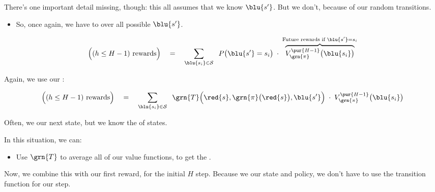         \subsecdiv

        There's one important detail missing, though: this all assumes that we know $\blu{s'}$. But we don't, because of our random transitions.

        \begin{itemize}
            \item So, once again, we have to  over all possible $\blu{s'}$.
        \end{itemize}

        \begin{equation}
            \Big( (h \leq H-1) \text{ rewards}\Big)  
            \quad=\quad 
                \sum_{\blu{s_i} \in \mathcal{S}}  
                    \;\;
                    P \big( \blu{s'}=s_i\big)
                    \;\cdot\; 
                    \overbrace{
                    V_{\grn{\pi}}^{\pur{H-1}}\big(\blu{s_i} \big)
                    }^{\text{Future rewards if }\blu{s'}=s_i}
        \end{equation}

        Again, we use our :

        

        \begin{equation}
            \Big( (h \leq H-1) \text{ rewards}\Big)    
            \quad=\quad 
                \sum_{\blu{s_i} \in \mathcal{S}}  
                    \;\;
                    \grn{T} \Big(          \red{s},\grn{\pi}\big(\red{s}\big),\blu{s'} \Big)
                    \;\cdot\; 
                    V_{\grn{\pi}}^{\pur{H-1}}\big(\blu{s_i} \big)
        \end{equation}

        \begin{concept}
            Often, we  our next state, but we know the  of states. 

            In this situation, we can:

            \begin{itemize}
                \item Use $\grn{T}$ to average all of our value functions, to get the .
            \end{itemize}
        \end{concept}

        Now, we combine this with our first reward, for the initial $H$ step. Because we  our state and policy, we don't have to use the transition function for our  step.

